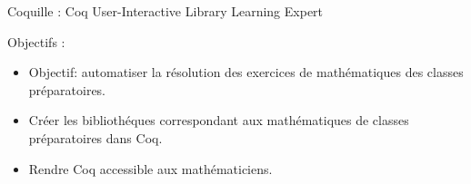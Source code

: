 \begin{frame}
Coquille : Coq User-Interactive Library Learning Expert

Objectifs :
\begin{itemize}
  \item Objectif: automatiser la résolution des exercices de mathématiques des classes préparatoires.
  \item Créer les bibliothéques correspondant aux mathématiques de classes préparatoires dans Coq. 
  \item Rendre Coq accessible aux mathématiciens. %
\end{itemize}
\end{frame}

